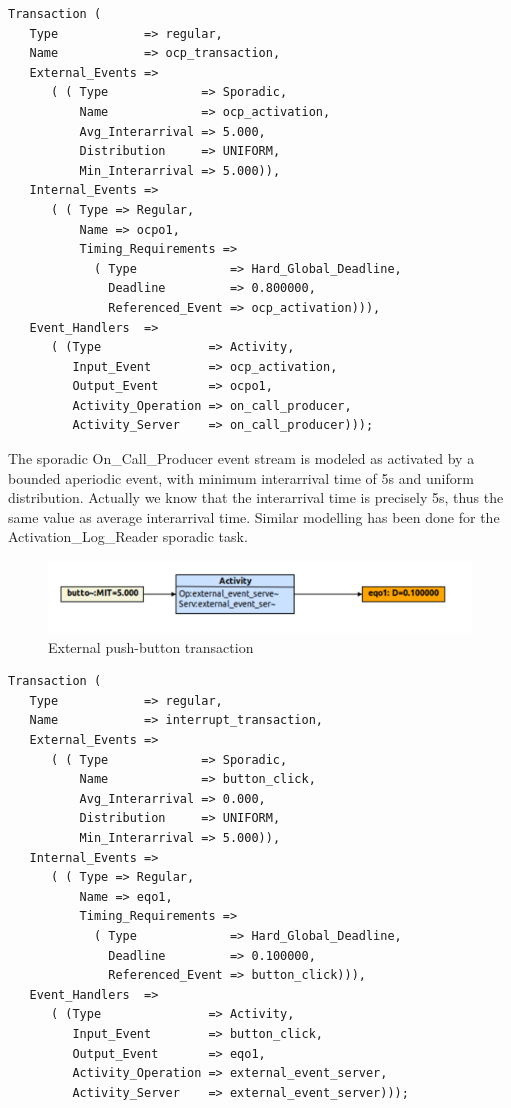 \documentclass{article}
\begin{document}
\begin{lstlisting}
Transaction (
   Type            => regular,
   Name            => ocp_transaction,
   External_Events =>
      ( ( Type             => Sporadic,
          Name             => ocp_activation,
          Avg_Interarrival => 5.000,
          Distribution     => UNIFORM,
          Min_Interarrival => 5.000)),
   Internal_Events =>
      ( ( Type => Regular,
          Name => ocpo1,
          Timing_Requirements =>
            ( Type             => Hard_Global_Deadline,
              Deadline         => 0.800000,
              Referenced_Event => ocp_activation))),
   Event_Handlers  =>
      ( (Type               => Activity,
         Input_Event        => ocp_activation,
         Output_Event       => ocpo1,
         Activity_Operation => on_call_producer,
         Activity_Server    => on_call_producer)));
\end{lstlisting}

The sporadic On\_Call\_Producer event stream is modeled as activated by a bounded aperiodic event, with minimum interarrival time of 5s and uniform distribution. Actually we know that the interarrival time is precisely 5s, thus the same value as average interarrival time. Similar modelling has been done for the Activation\_Log\_Reader sporadic task.

\begin{figure}[!htbp]
\centering
\includegraphics[width=6in]{images/transaction-eq}
\caption{External push-button transaction}
\label{transaction-eq}
\end{figure}

\begin{lstlisting}
Transaction (
   Type            => regular,
   Name            => interrupt_transaction,
   External_Events =>
      ( ( Type             => Sporadic,
          Name             => button_click,
          Avg_Interarrival => 0.000,
          Distribution     => UNIFORM,
          Min_Interarrival => 5.000)),
   Internal_Events =>
      ( ( Type => Regular,
          Name => eqo1,
          Timing_Requirements =>
            ( Type             => Hard_Global_Deadline,
              Deadline         => 0.100000,
              Referenced_Event => button_click))),
   Event_Handlers  =>
      ( (Type               => Activity,
         Input_Event        => button_click,
         Output_Event       => eqo1,
         Activity_Operation => external_event_server,
         Activity_Server    => external_event_server)));
\end{lstlisting}
\end{document}
